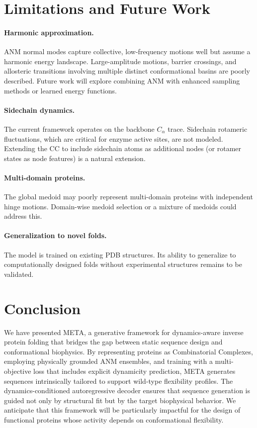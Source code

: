\documentclass{article}
\begin{document}
\section{Limitations and Future Work}

\paragraph{Harmonic approximation.} ANM normal modes capture collective, low-frequency motions well but assume a harmonic energy landscape. Large-amplitude motions, barrier crossings, and allosteric transitions involving multiple distinct conformational basins are poorly described. Future work will explore combining ANM with enhanced sampling methods or learned energy functions.

\paragraph{Sidechain dynamics.} The current framework operates on the backbone $C_\alpha$ trace. Sidechain rotameric fluctuations, which are critical for enzyme active sites, are not modeled. Extending the CC to include sidechain atoms as additional nodes (or rotamer states as node features) is a natural extension.

\paragraph{Multi-domain proteins.} The global medoid may poorly represent multi-domain proteins with independent hinge motions. Domain-wise medoid selection or a mixture of medoids could address this.

\paragraph{Generalization to novel folds.} The model is trained on existing PDB structures. Its ability to generalize to computationally designed folds without experimental structures remains to be validated.

\section{Conclusion}
We have presented META, a generative framework for dynamics-aware inverse protein folding that bridges the gap between static sequence design and conformational biophysics. By representing proteins as Combinatorial Complexes, employing physically grounded ANM ensembles, and training with a multi-objective loss that includes explicit dynamicity prediction, META generates sequences intrinsically tailored to support wild-type flexibility profiles. The dynamics-conditioned autoregressive decoder ensures that sequence generation is guided not only by structural fit but by the target biophysical behavior. We anticipate that this framework will be particularly impactful for the design of functional proteins whose activity depends on conformational flexibility.
\end{document}
